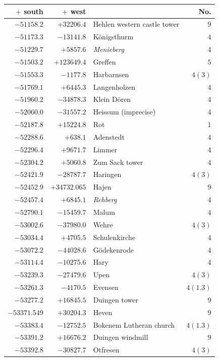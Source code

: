 \begin{center}\begingroup\fontsize{8}{9}\selectfont
\setlength{\tabcolsep}{4pt}
\begin{tabular}{r|r|p{170pt}|r}\hline
\(+\) south&\(+\) west&&No.\\\hline
\(-51158.2\)&\(+32206.4\)&Hehlen western castle tower&\(9\)\\
\(-51173.3\)&\(-13141.8\)&Königsthurm&\(4\)\\
\(-51229.7\)&\(+5857.6\)&\textit{Menieberg}&\(4\)\\
\(-51503.2\)&\(+123649.4\)&Greffen&\(5\)\\
\(-51553.3\)&\(-1177.8\)&Harbarnsen&\(4(3)\)\\
\(-51769.1\)&\(+6445.3\)&Langenholzen&\(4\)\\
\(-51960.2\)&\(-34878.3\)&Klein Dören&\(4\)\\
\(-52060.0\)&\(-31557.2\)&Heissum (imprecise)&\(4\)\\
\(-52187.8\)&\(+15224.8\)&Rot&\(1\)\\
\(-52288.6\)&\(+638.1\)&Adenstedt&\(4\)\\
\(-52296.4\)&\(+9671.7\)&Limmer&\(4\)\\
\(-52304.2\)&\(+5060.8\)&Zum Sack tower&\(4\)\\
\(-52421.9\)&\(-28787.7\)&Haringen&\(4(3)\)\\
\(-52452.9\)&\(+34732.065\)&Hajen&\(9\)\\
\(-52457.4\)&\(+6845.1\)&\textit{Rehberg}&\(4\)\\
\(-52790.1\)&\(-15459.7\)&Malum&\(4\)\\
\(-53002.6\)&\(-37980.0\)&Wehre&\(4(3)\)\\
\(-53034.4\)&\(+4705.5\)&Schulenkirche&\(4\)\\
\(-53072.2\)&\(-44028.6\)&Gödekenrode&\(4\)\\
\(-53114.4\)&\(-10275.6\)&Hary&\(4\)\\
\(-53239.3\)&\(-27479.6\)&Upen&\(4(3)\)\\
\(-53261.3\)&\(-4170.5\)&Evensen&\(4(1.3)\)\\
\(-53277.2\)&\(+16845.5\)&Duingen tower&\(9\)\\
\(-53371.549\)&\(+30204.3\)&Heven&\(9\)\\
\(-53383.4\)&\(-12752.5\)&Bokenem Lutheran church&\(4(1.3)\)\\
\(-53391.2\)&\(+16676.2\)&Duingen windmill&\(9\)\\
\(-53392.8\)&\(-30827.7\)&Otfresen&\(4(3)\)\\

\end{tabular}
\end{center}
